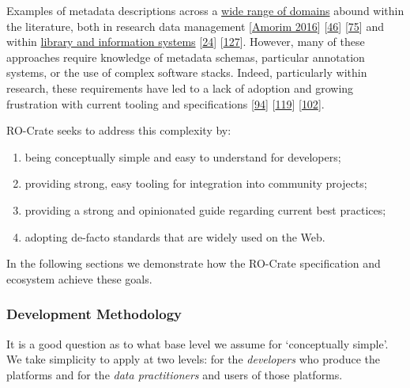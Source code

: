 Examples of metadata descriptions across a
\href{https://rdamsc.bath.ac.uk/scheme-index}{wide range of domains}
abound within the literature, both in research data management
{[}\href{https://doi.org/10.1007/s10209-016-0475-y}{Amorim 2016}{]}
{[}\href{https://dcpapers.dublincore.org/pubs/article/view/3714}{46}{]}
{[}\href{https://doi.org/10.2777/620649}{75}{]} and within
\href{https://www.loc.gov/librarians/standards}{library and information
systems} {[}\href{https://identifiers.org/isbn/9781563081910}{24}{]}
{[}\href{https://doi.org/10.1515/9783598441844}{127}{]}. However, many
of these approaches require knowledge of metadata schemas, particular
annotation systems, or the use of complex software stacks. Indeed,
particularly within research, these requirements have led to a lack of
adoption and growing frustration with current tooling and specifications
{[}\href{https://cameronneylon.net/blog/as-a-researcher-im-a-bit-bloody-fed-up-with-data-management/}{94}{]}
{[}\href{https://doi.org/10.1007/s00267-014-0258-2}{119}{]}
{[}\href{https://doi.org/10.1038/s41597-020-0524-5}{102}{]}.

RO-Crate seeks to address this complexity by:

\begin{enumerate}
\def\labelenumi{\arabic{enumi}.}
\tightlist
\item
  being conceptually simple and easy to understand for developers;
\item
  providing strong, easy tooling for integration into community
  projects;
\item
  providing a strong and opinionated guide regarding current best
  practices;
\item
  adopting de-facto standards that are widely used on the Web.
\end{enumerate}

In the following sections we demonstrate how the RO-Crate specification
and ecosystem achieve these goals.

\hypertarget{methodology}{%
\subsubsection{Development Methodology}\label{methodology}}

It is a good question as to what base level we assume for `conceptually
simple'. We take simplicity to apply at two levels: for the
\emph{developers} who produce the platforms and for the \emph{data
practitioners} and users of those platforms.

